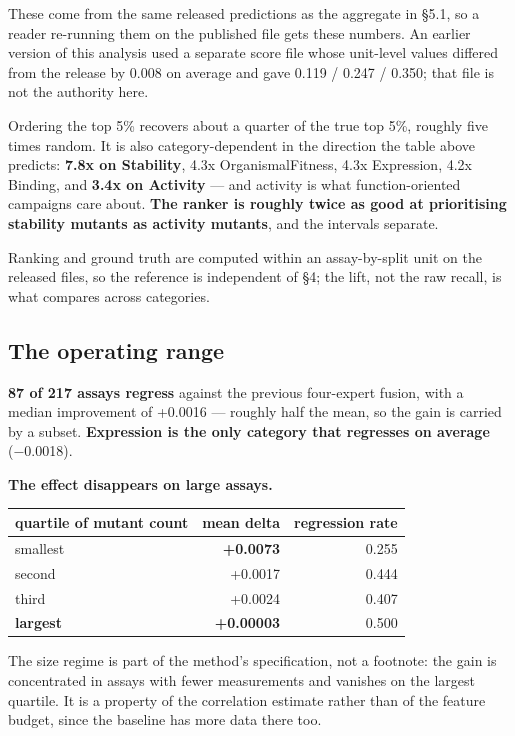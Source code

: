 \documentclass{article}
\begin{document}
These come from the same released predictions as the aggregate in §5.1, so a reader re-running them on the published
file gets these numbers. An earlier version of this analysis used a separate score file whose unit-level values
differed from the release by 0.008 on average and gave 0.119 / 0.247 / 0.350; that file is not the authority here.

Ordering the top 5\% recovers about a quarter of the true top 5\%, roughly five times random. It is also
category-dependent in the direction the table above predicts: \textbf{7.8x on Stability}, 4.3x OrganismalFitness, 4.3x
Expression, 4.2x Binding, and \textbf{3.4x on Activity} --- and activity is what
function-oriented campaigns care about. \textbf{The ranker is roughly twice as good at prioritising stability mutants as
activity mutants}, and the intervals separate.

Ranking and ground truth are computed within an assay-by-split unit on the released files, so the reference is
independent of §4; the lift, not the raw recall, is what compares across categories.

\subsection{The operating range}\label{the-operating-range}

\textbf{87 of 217 assays regress} against the previous four-expert fusion, with a median improvement of
+0.0016 --- roughly half the mean, so the gain is carried by a subset. \textbf{Expression is the only category
that regresses on average} (−0.0018).

\textbf{The effect disappears on large assays.}

\begin{table}[!t]
\centering
\small
\begin{tabular}{lrr}
\hline
quartile of mutant count & mean delta & regression rate \\
\hline
smallest & \textbf{+0.0073} & 0.255 \\
second & +0.0017 & 0.444 \\
third & +0.0024 & 0.407 \\
\textbf{largest} & \textbf{+0.00003} & 0.500 \\
\hline
\end{tabular}
\end{table}

The size regime is part of the method's specification, not a footnote: the gain is concentrated in assays with
fewer measurements and vanishes on the largest quartile. It is a property of the correlation estimate rather than
of the feature budget, since the baseline has more data there too.
\end{document}
